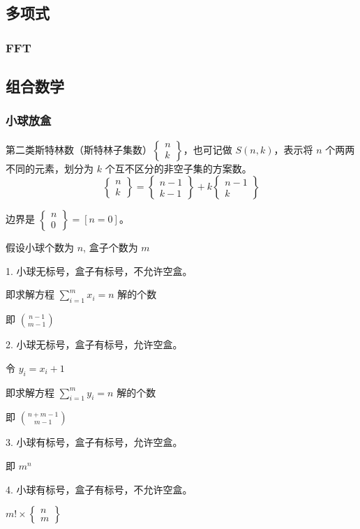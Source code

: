 \documentclass[a4paper]{article}
\begin{document}
\subsection{多项式}
\subsubsection{FFT}

\subsection{组合数学}
\subsubsection{小球放盒}
第二类斯特林数（斯特林子集数）$\begin{Bmatrix}n\\ k\end{Bmatrix}$，也可记做 $S(n,k)$，表示将 $n$ 个两两不同的元素，划分为 $k$ 个互不区分的非空子集的方案数。
$$
\begin{Bmatrix}n\\ k\end{Bmatrix}=\begin{Bmatrix}n-1\\ k-1\end{Bmatrix}+k\begin{Bmatrix}n-1\\ k\end{Bmatrix}
$$

边界是 $\begin{Bmatrix}n\\ 0\end{Bmatrix}=[n=0]$。

假设小球个数为 $n$, 盒子个数为 $m$

1. 小球无标号，盒子有标号，不允许空盒。

   即求解方程 $\sum\limits_{i=1}^mx_i=n$ 解的个数

   即 $\binom{n-1}{m-1}$

2. 小球无标号，盒子有标号，允许空盒。

   令 $y_i=x_i+1$

   即求解方程 $\sum\limits_{i=1}^my_i=n$ 解的个数

   即 $\binom{n+m-1}{m-1}$

3. 小球有标号，盒子有标号，允许空盒。

   即 $m^n$

4. 小球有标号，盒子有标号，不允许空盒。

   $m!\times \begin{Bmatrix}n\\ m\end{Bmatrix}$
\end{document}
